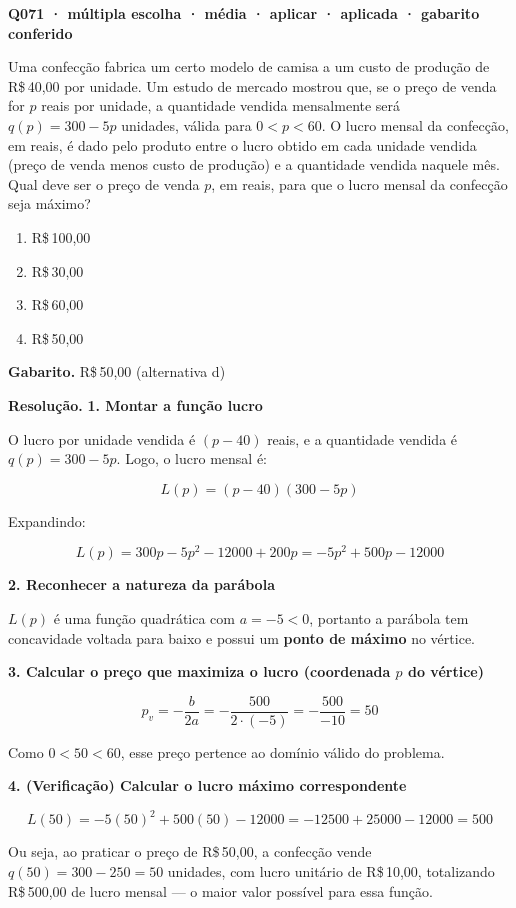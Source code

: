 \documentclass[11pt,a4paper]{article}
\begin{document}
\bigskip\noindent\textbf{Q071 · múltipla escolha · média · aplicar · aplicada · gabarito conferido}\par\nopagebreak
Uma confecção fabrica um certo modelo de camisa a um custo de produção de R\$\,40,00 por unidade. Um estudo de mercado mostrou que, se o preço de venda for $p$ reais por unidade, a quantidade vendida mensalmente será $q(p) = 300 - 5p$ unidades, válida para $0 < p < 60$. O lucro mensal da confecção, em reais, é dado pelo produto entre o lucro obtido em cada unidade vendida (preço de venda menos custo de produção) e a quantidade vendida naquele mês. Qual deve ser o preço de venda $p$, em reais, para que o lucro mensal da confecção seja máximo?
\begin{enumerate}[label=(\alph*)]
\item R\$\,100,00
\item R\$\,30,00
\item R\$\,60,00
\item R\$\,50,00
\end{enumerate}

\textbf{Gabarito.} R\$\,50,00 (alternativa d)

\textbf{Resolução.} \textbf{1. Montar a função lucro}

O lucro por unidade vendida é $(p-40)$ reais, e a quantidade vendida é $q(p)=300-5p$. Logo, o lucro mensal é:

$$L(p) = (p-40)(300-5p)$$

Expandindo:

$$L(p) = 300p - 5p^2 - 12000 + 200p = -5p^2 + 500p - 12000$$

\textbf{2. Reconhecer a natureza da parábola}

$L(p)$ é uma função quadrática com $a = -5 < 0$, portanto a parábola tem concavidade voltada para baixo e possui um \textbf{ponto de máximo} no vértice.

\textbf{3. Calcular o preço que maximiza o lucro (coordenada $p$ do vértice)}

$$p_v = -\frac{b}{2a} = -\frac{500}{2\cdot(-5)} = -\frac{500}{-10} = 50$$

Como $0 < 50 < 60$, esse preço pertence ao domínio válido do problema.

\textbf{4. (Verificação) Calcular o lucro máximo correspondente}

$$L(50) = -5(50)^2 + 500(50) - 12000 = -12500 + 25000 - 12000 = 500$$

Ou seja, ao praticar o preço de R\$\,50,00, a confecção vende $q(50)=300-250=50$ unidades, com lucro unitário de R\$\,10,00, totalizando R\$\,500,00 de lucro mensal — o maior valor possível para essa função.
\end{document}
